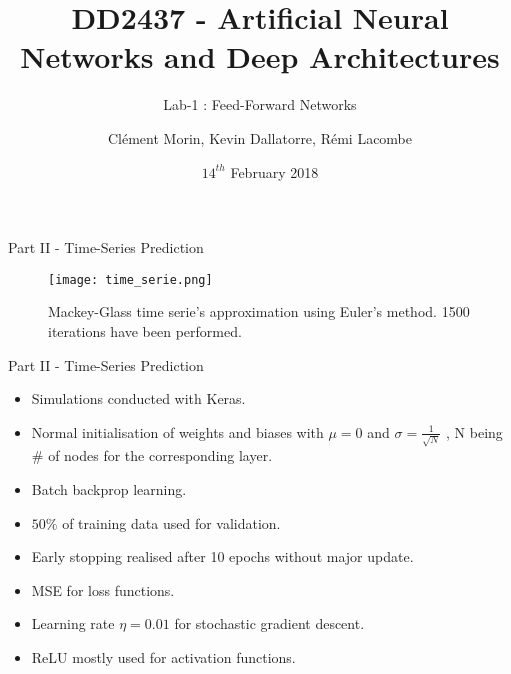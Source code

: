 \documentclass{beamer}
\title{DD2437 - Artificial Neural Networks and Deep Architectures}
\subtitle{Lab-1 : Feed-Forward Networks}
\author{Clément Morin, Kevin Dallatorre, Rémi Lacombe}
\date{$14^{th}$ February 2018}
\begin{document}
\begin{frame}
  \titlepage
\end{frame}


\begin{frame}{Part II - Time-Series Prediction}
    
    \begin{figure} [H]
    \centering
    \texttt{[image: time\_serie.png]}
    \caption{Mackey-Glass time serie's approximation using Euler's method. 1500 iterations have been performed.}
    \end{figure}

\end{frame}


\begin{frame}{Part II - Time-Series Prediction}
    
    \begin{itemize}
        \item Simulations conducted with Keras.
        \item Normal initialisation of weights and biases with $\mu=0$ and $\sigma=\frac{1}{\sqrt{N}}$ , N being $\#$ of nodes for the corresponding layer.
        \item Batch backprop learning.
        \item $50\%$ of training data used for validation.
        \item Early stopping realised after 10 epochs without major update.
        \item MSE for loss functions.
        \item Learning rate $\eta=0.01$ for stochastic gradient descent.
        \item ReLU mostly used for activation functions. 
    \end{itemize}
    
\end{frame}
\end{document}
